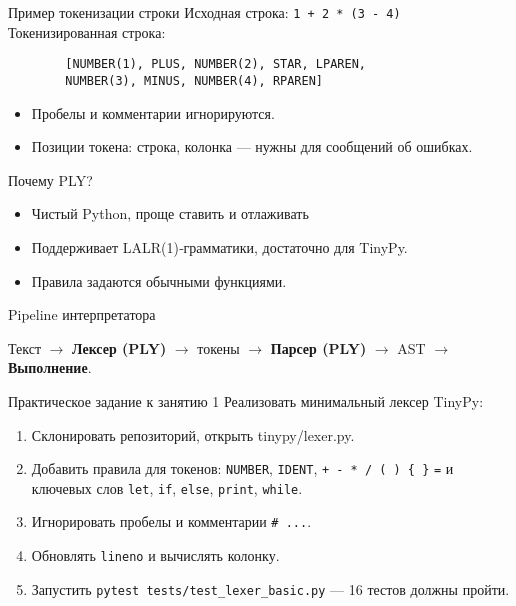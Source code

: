 \documentclass[aspectratio=169]{beamer}
\begin{document}
\begin{frame}[fragile]{Пример токенизации строки}
	Исходная строка: \texttt{1 + 2 * (3 - 4)} \newline
	Токенизированная строка:
	\begin{verbatim}
        [NUMBER(1), PLUS, NUMBER(2), STAR, LPAREN,
        NUMBER(3), MINUS, NUMBER(4), RPAREN]
    \end{verbatim}
	\begin{itemize}
		\item Пробелы и комментарии игнорируются.
		\item Позиции токена: строка, колонка — нужны для сообщений об ошибках.
	\end{itemize}
\end{frame}

\begin{frame}{Почему PLY?}
	\begin{itemize}
		\item Чистый Python, проще ставить и отлаживать
		\item Поддерживает LALR(1)‑грамматики, достаточно для TinyPy.
		\item Правила задаются обычными функциями.
	\end{itemize}
\end{frame}

\begin{frame}{Pipeline интерпретатора}
	\centering
	\begin{small}
		Текст $\rightarrow$ \textbf{Лексер (PLY)} $\rightarrow$ токены $\rightarrow$ \textbf{Парсер (PLY)} $\rightarrow$ AST $\rightarrow$ \textbf{Выполнение}.
	\end{small}
\end{frame}

\begin{frame}{Практическое задание к занятию 1}
	Реализовать минимальный лексер TinyPy:
	\begin{enumerate}
		\item Склонировать репозиторий, открыть tinypy/lexer.py.
		\item Добавить правила для токенов: \texttt{NUMBER}, \texttt{IDENT}, \texttt{+ - * / ( ) \{ \}} \texttt{=} и ключевых слов \texttt{let}, \texttt{if}, \texttt{else}, \texttt{print}, \texttt{while}.
		\item Игнорировать пробелы и комментарии \texttt{\# ...}.
		\item Обновлять \texttt{lineno} и вычислять колонку.
		\item Запустить \texttt{pytest tests/test\_lexer\_basic.py} — 16 тестов должны пройти.
	\end{enumerate}
\end{frame}
\end{document}
